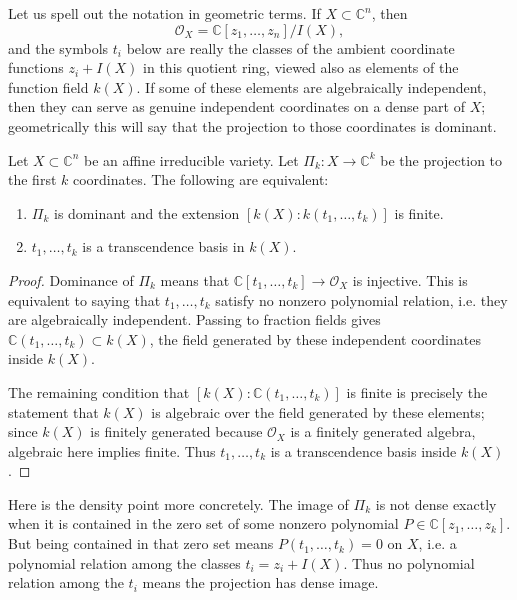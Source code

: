 \noindent
Let us spell out the notation in geometric
terms. If $X\subset \mathbb{C}^n$, then
$$
\mathcal{O}_X
=\mathbb{C}[z_1,\ldots,z_n]/I(X),
$$
and the symbols $t_i$ below are really the
classes of the ambient coordinate functions
$z_i+I(X)$ in this quotient ring, viewed also
as elements of the function field $k(X)$.
If some of these elements are algebraically
independent, then they can serve as genuine
independent coordinates on a dense part of
$X$; geometrically this will say that the
projection to those coordinates is dominant.

\begin{proposition}
\label{proposition-dominant-transcendence}
Let $X \subset \mathbb{C}^n$ be an 
affine irreducible variety.
Let $\Pi_k:X \to \mathbb{C}^k$
be the projection to the first $k$
coordinates.
The following are equivalent:
\begin{enumerate}
\item $\Pi_k$ is dominant
and the extension $[k(X):k(t_1,…,t_k)]$
is finite.
\item $t_1,…,t_k$ is a transcendence basis
in $k(X)$.
\end{enumerate}
\end{proposition}

\begin{proof}
Dominance of $\Pi_k$ means that
$\mathbb{C}[t_1,\ldots,t_k]\to
\mathcal{O}_X$ is injective.
This is equivalent to saying that
$t_1,\ldots,t_k$ satisfy no nonzero
polynomial relation, i.e. they are
algebraically independent.
Passing to fraction fields gives
$\mathbb{C}(t_1,\ldots,t_k)\subset k(X)$,
the field generated by these independent
coordinates inside $k(X)$.

The remaining condition that
$[k(X):\mathbb{C}(t_1,\ldots,t_k)]$ is finite
is precisely the statement that $k(X)$ is
algebraic over the field generated by these
elements; since $k(X)$ is finitely generated
because $\mathcal{O}_X$ is a finitely
generated algebra, algebraic here implies
finite. Thus
$t_1,\ldots,t_k$ is a transcendence basis
inside $k(X)$.
\end{proof}

\noindent
Here is the density point more concretely.
The image of $\Pi_k$ is not dense exactly
when it is contained in the zero set of some
nonzero polynomial
$P \in \mathbb{C}[z_1,\ldots,z_k]$.
But being contained in that zero set means
$P(t_1,\ldots,t_k)=0$ on $X$, i.e. a
polynomial relation among the classes
$t_i=z_i+I(X)$.
Thus no polynomial relation among the $t_i$
means the projection has dense image.

